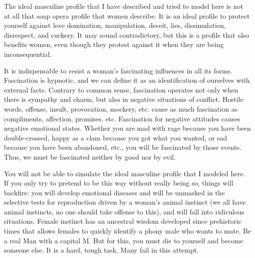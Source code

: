 \par The ideal masculine profile that I have described and tried to model here is not at all that soap opera profile that women describe. It is an ideal profile to protect yourself against love domination, manipulation, deceit, lies, dissimulation, disrespect, and cuckery. It may sound contradictory, but this is a profile that also benefits women, even though they protest against it when they are being inconsequential.

\par It is indispensable to resist a woman's fascinating influences in all its forms. Fascination is hypnotic, and we can define it as an identification of ourselves with external facts. Contrary to common sense, fascination operates not only when there is sympathy and charm, but also in negative situations of conflict. Hostile words, offense, insult, provocation, mockery, etc. cause as much fascination as compliments, affection, promises, etc. Fascination for negative attitudes causes negative emotional states. Whether you are mad with rage because you have been double-crossed, happy as a clam because you got what you wanted, or sad because you have been abandoned, etc., you will be fascinated by those events. Thus, we must be fascinated neither by good nor by evil.

\par You will not be able to simulate the ideal masculine profile that I modeled here. If you only try to pretend to be this way without really being so, things will backfire: you will develop emotional diseases and will be unmasked in the selective tests for reproduction driven by a woman's animal instinct (we all have animal instincts, no one should take offense to this), and will fall into ridiculous situations. Female instinct has an ancestral wisdom developed since prehistoric times that allows females to quickly identify a phony male who wants to mate. Be a real Man with a capital M. But for this, you must die to yourself and become someone else. It is a hard, tough task. Many fail in this attempt.

